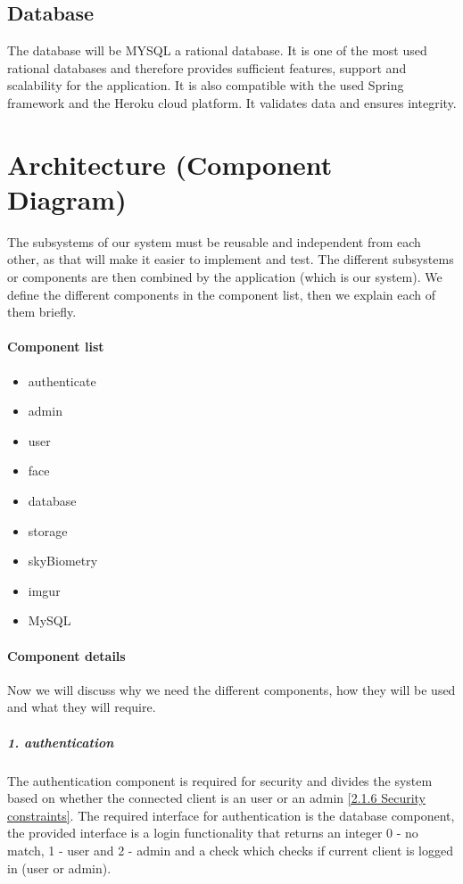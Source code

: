 \documentclass[a4paper,11pt]{article}
\begin{document}
\subsection{Database}
The database will be MYSQL a rational database.
It is one of the most used rational databases and therefore provides sufficient features, support and scalability for the application. It is also compatible with the used Spring framework and the Heroku cloud platform. It validates data and ensures integrity.




\section{Architecture (Component Diagram)} \label{Architecture}
The subsystems of our system must be reusable and independent from each
other, as that will make it easier to implement and test. The different
subsystems or components are then combined by the application (which is
our system). We define the different components in the component list,
then we explain each of them briefly.

\paragraph{Component list}\label{component-list}

\begin{itemize}
\item
  authenticate
\item
  admin
\item
  user
\item
  face
\item
  database
\item
  storage
\item
  skyBiometry
\item
  imgur
\item
  MySQL
\end{itemize}

\paragraph{Component details}\label{component-details}

Now we will discuss why we need the different components, how they will
be used and what they will require.

\subparagraph{1. authentication}\label{authentication}

The authentication component is required for security and divides the
system based on whether the connected client is an user or an admin \ref{2.1.6 Security constraints}. The
required interface for authentication is the database component, the
provided interface is a login functionality that returns an integer 0 -
no match, 1 - user and 2 - admin and a check which checks if current
client is logged in (user or admin).
\end{document}
